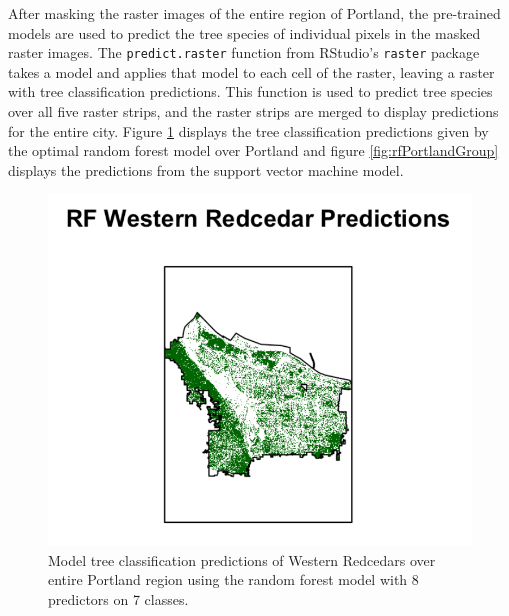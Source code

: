 \documentclass[12pt,twoside]{reedthesis}
\begin{document}
After masking the raster images of the entire region of Portland, the pre-trained models are used to predict the tree species of individual pixels in the masked raster images. The \texttt{predict.raster} function from RStudio's \texttt{raster} package takes a model and applies that model to each cell of the raster, leaving a raster with tree classification predictions. This function is used to predict tree species over all five raster strips, and the raster strips are merged to display predictions for the entire city. Figure \ref{fig:rfPortland} displays the tree classification predictions given by the optimal random forest model over Portland and figure \ref{fig:rfPortlandGroup} displays the predictions from the support vector machine model.
\begin{figure}

{\centering \includegraphics[width=1\linewidth]{figure/rfPortland} 

}

\caption{Model tree classification predictions of Western Redcedars over entire Portland region using the random forest model with 8 predictors on 7 classes.}\label{fig:rfPortland}
\end{figure}
\end{document}
